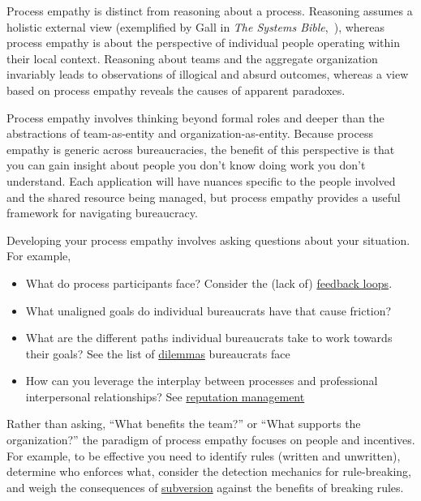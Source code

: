 Process empathy is distinct from reasoning about a process. Reasoning assumes a holistic external view (exemplified by Gall in \textit{The Systems Bible},~\cite{2002_Gall}), whereas process empathy is about the perspective of individual people operating within their local context. Reasoning about teams and the aggregate organization invariably leads to observations of illogical and absurd outcomes, whereas a view based on process empathy reveals the causes of apparent paradoxes.

Process empathy involves thinking beyond formal roles and deeper than the abstractions of team-as-entity and organization-as-entity. 
Because process empathy is generic across bureaucracies, the benefit of this perspective is that you can gain insight about people you don't know doing work you don't understand.
Each application will have nuances specific to the people involved and the shared resource being managed, but process empathy provides a useful framework for navigating bureaucracy.


Developing your process empathy involves asking questions about your situation. For example, 
\begin{itemize}
    \item What 
    \iftoggle{glossarysubstitutionworks}{\glspl{incentive}}{incentives} do process participants face?
Consider the (lack of) \hyperref[sec:feedback-loop-and-ripples]{feedback loops}.
    \item What unaligned goals do individual bureaucrats have that cause friction?
    \item What are the different paths individual bureaucrats take to work towards their goals?
See the list of \hyperref[sec:dilemma-trilemma]{dilemmas} bureaucrats face\iftoggle{haspagenumbers}{ on page~\pageref{sec:dilemma-trilemma}.}{.}
    \item How can you leverage the interplay between processes and  professional interpersonal relationships?  See \hyperref[sec:reputation]{reputation management}\iftoggle{haspagenumbers}{ on page~\pageref{sec:reputation}.}{.}
\end{itemize}

Rather than asking, ``What benefits the team?'' or ``What supports the organization?'' the paradigm of process empathy focuses on people and incentives. %
For example, to be effective you need to 
identify rules (written and unwritten), determine who enforces what, consider the detection mechanics for rule-breaking, and weigh the consequences of %
\href{https://en.wikipedia.org/wiki/Subversion}{subversion}
against the benefits of breaking rules.


